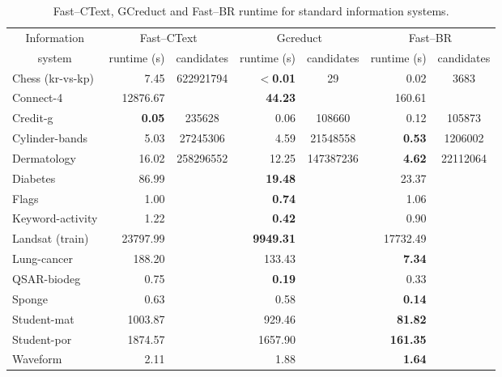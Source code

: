 \documentclass[number,preprint,review,12pt]{elsarticle}
\begin{document}
	\begin{table}[!htb]
		\centering \footnotesize
		\caption{Fast--CText, GCreduct and Fast--BR runtime for standard information systems.}
		\label{tab:java}
		\begin{tabular}{|l|r|c|r|c|r|c|}
			\hline
			\multicolumn{1}{|c|}{Information}  & \multicolumn{2}{c|}{Fast--CText} & \multicolumn{2}{c|}{Gcreduct} & \multicolumn{2}{c|}{Fast--BR}  \\
			\cline{2-7}
			\multicolumn{1}{|c|}{system} & runtime (s) & candidates & runtime (s)  & candidates & runtime (s) & candidates \\
			\hline
			Chess (kr-vs-kp)          & 7.45          & 622921794 & \textbf{$<$0.01} & 29 & 0.02         & 3683 \\
			Connect-4                 & 12876.67      & & \textbf{44.23}   & & 160.61         &  \\
			Credit-g                  & \textbf{0.05} & 235628 & 0.06 & 108660 & 0.12 & 105873 \\
			Cylinder-bands            & 5.03          & 27245306 & 4.59 & 21548558 & \textbf{0.53}  & 1206002 \\
			Dermatology               & 16.02         & 258296552 & 12.25            & 147387236 & \textbf{4.62}  & 22112064 \\
			Diabetes                  & 86.99         & & \textbf{19.48}   & & 23.37          &  \\
			Flags                     & 1.00          & & \textbf{0.74}    & & 1.06           &  \\
			Keyword-activity          & 1.22          & & \textbf{0.42}    & & 0.90           &  \\
			Landsat (train)           & 23797.99      & & \textbf{9949.31} & & 17732.49       &  \\
			Lung-cancer               & 188.20        & & 133.43           & & \textbf{7.34}  &  \\
			QSAR-biodeg               & 0.75          & & \textbf{0.19}    & & 0.33           &  \\
			Sponge                    & 0.63          & & 0.58             & & \textbf{0.14}  &  \\
 			Student-mat               & 1003.87       & & 929.46           & & \textbf{81.82} &  \\
			Student-por               & 1874.57       & & 1657.90          & & \textbf{161.35}& \\
			Waveform                  & 2.11          & & 1.88             & & \textbf{1.64}  & \\
			\hline
		\end{tabular}
	\end{table}
\end{document}
